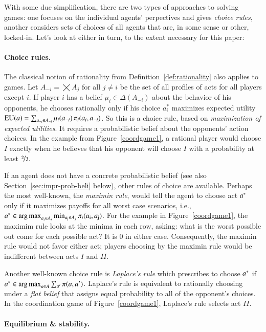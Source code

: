 \documentclass[fleqn,reqno,11pt]{article}
\begin{document}
With some due simplification, there are two types of approaches to solving games: one focuses
on the individual agents' perpectives and gives \emph{choice rules}, another considers sets of
choices of all agents that are, in some sense or other, locked-in. Let's look at either in
turn, to the extent necessary for this paper:

\paragraph{Choice rules.} The classical notion of rationality from
Definition~\ref{def:rationality} also applies to games. Let $A_{-i} = \bigtimes A_j$ for all
$j \neq i$ be the set of all profiles of acts for all players except $i$. If player $i$ has a
belief $\mu_i \in \Delta(A_{-i})$ about the behavior of his opponents, he chooses rationally
only if his choice $a^*_i$ maximizes expected utility
$\operatorname{EU}(a) = \sum_{a_{-i} \in A_{-i}} \mu_i(a_{-i}) \thinspace \pi_i(a_i, a_{-i})$. So this
is a choice rule, based on \emph{maximization of expected utilities}. It requires a
probabilistic belief about the opponents' action choices. In the example from
Figure~\ref{coordgame1}, a rational player would choose $I$ exactly when he believes that his
opponent will choose $I$ with a probability at least $\nicefrac{2}{3}$.

If an agent does not have a concrete probabilistic belief (see also
Section~\ref{sec:impr-prob-beli} below), other rules of choice are available. Perhaps the most
well-known, the \emph{maximin rule}, would tell the agent to choose act $a^*$ only if it
maximizes payoffs for all worst case scenarios, i.e.,
$a^* \in \operatorname*{arg\,max}_{a_{\text{i}} \in A_i} \min_{a_{\text{j}} \in A_j} \pi_i(a_{\text{i}},
a_{\text{j}})$. For the example in Figure~\ref{coordgame1}, the maximim rule looks at the minima
in each row, asking: what is the worst possible out come for each possible act? It is $0$ in
either case. Consequently, the maximin rule would not favor either act; players choosing by the
maximin rule would be indifferent between acts $I$ and $II$.

Another well-known choice rule is \emph{Laplace's rule} which prescribes to choose $a^*$ if
$a^* \in \operatorname*{arg\,max}_{a \in A} \sum_{a'} \pi(a, a')$. Laplace's rule is equivalent to rationally
choosing under a \emph{flat belief} that assigns equal probability to all of the opponent's
choices. In the coordination game of Figure~\ref{coordgame1}, Laplace's rule selects act $II$.

\paragraph{Equilibrium \& stability.}
\end{document}
